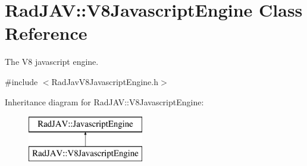 \hypertarget{class_rad_j_a_v_1_1_v8_javascript_engine}{}\section{Rad\+J\+AV\+:\+:V8\+Javascript\+Engine Class Reference}
\label{class_rad_j_a_v_1_1_v8_javascript_engine}


The V8 javascript engine.  




{\ttfamily \#include $<$Rad\+Jav\+V8\+Javascript\+Engine.\+h$>$}

Inheritance diagram for Rad\+J\+AV\+:\+:V8\+Javascript\+Engine\+:\begin{figure}[H]
\begin{center}
\leavevmode
\includegraphics[height=2.000000cm]{class_rad_j_a_v_1_1_v8_javascript_engine}
\end{center}
\end{figure}
